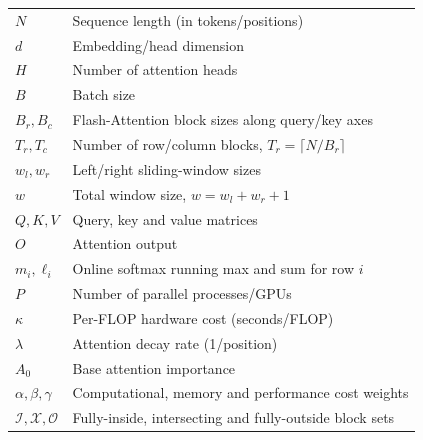 \begin{longtable}[l]{l l}
$N$                 & Sequence length (in tokens/positions) \\
$d$                 & Embedding/head dimension \\
$H$                 & Number of attention heads \\
$B$                 & Batch size \\
$B_r, B_c$          & Flash-Attention block sizes along query/key axes \\
$T_r, T_c$          & Number of row/column blocks, $T_r=\lceil N/B_r\rceil$ \\
$w_l, w_r$          & Left/right sliding-window sizes \\
$w$                 & Total window size, $w=w_l+w_r+1$ \\
$Q, K, V$           & Query, key and value matrices \\
$O$                 & Attention output \\
$m_i, \ell_i$       & Online softmax running max and sum for row $i$ \\
$P$                 & Number of parallel processes/GPUs \\
$\kappa$            & Per-FLOP hardware cost (seconds/FLOP) \\
$\lambda$           & Attention decay rate (1/position) \\
$A_0$               & Base attention importance \\
$\alpha,\beta,\gamma$ & Computational, memory and performance cost weights \\
$\mathcal{I},\mathcal{X},\mathcal{O}$ & Fully-inside, intersecting and fully-outside block sets \\
\end{longtable}
